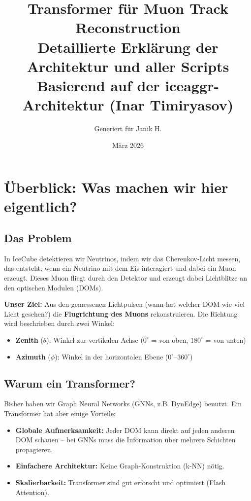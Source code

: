 \documentclass[12pt, a4paper]{article}
\title{%
    \vspace{-1cm}
    \textbf{Transformer f\"ur Muon Track Reconstruction}\\[0.5em]
    \large Detaillierte Erkl\"arung der Architektur und aller Scripts\\[0.3em]
    \normalsize Basierend auf der iceaggr-Architektur (Inar Timiryasov)
}
\author{Generiert f\"ur Janik H.}
\date{M\"arz 2026}
\begin{document}
\maketitle
\tableofcontents
\newpage

\section{\"Uberblick: Was machen wir hier eigentlich?}

\subsection{Das Problem}
In IceCube detektieren wir Neutrinos, indem wir das Cherenkov-Licht messen,
das entsteht, wenn ein Neutrino mit dem Eis interagiert und dabei ein Muon
erzeugt. Dieses Muon fliegt durch den Detektor und erzeugt dabei Lichtblitze
an den optischen Modulen (DOMs).

\textbf{Unser Ziel:} Aus den gemessenen Lichtpulsen (wann hat welcher DOM
wie viel Licht gesehen?) die \textbf{Flugrichtung des Muons} rekonstruieren.
Die Richtung wird beschrieben durch zwei Winkel:
\begin{itemize}
    \item \textbf{Zenith} ($\theta$): Winkel zur vertikalen Achse ($0^\circ$ = von oben, $180^\circ$ = von unten)
    \item \textbf{Azimuth} ($\phi$): Winkel in der horizontalen Ebene ($0^\circ$--$360^\circ$)
\end{itemize}

\subsection{Warum ein Transformer?}
Bisher haben wir Graph Neural Networks (GNNs, z.B. DynEdge) benutzt.
Ein Transformer hat aber einige Vorteile:
\begin{itemize}
    \item \textbf{Globale Aufmerksamkeit:} Jeder DOM kann direkt auf jeden anderen DOM schauen --
          bei GNNs muss die Information \"uber mehrere Schichten propagieren.
    \item \textbf{Einfachere Architektur:} Keine Graph-Konstruktion (k-NN) n\"otig.
    \item \textbf{Skalierbarkeit:} Transformer sind gut erforscht und optimiert (Flash Attention).
\end{itemize}
\end{document}
